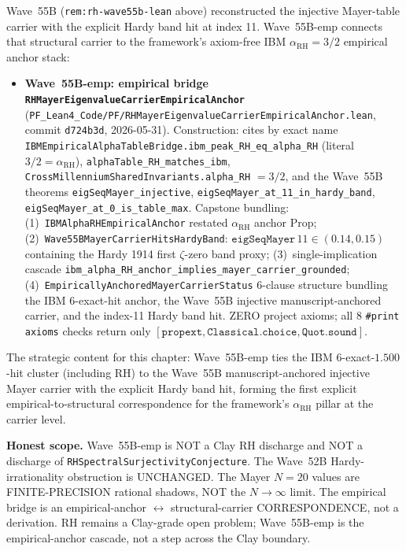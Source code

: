 \begin{remark}[Wave~55B empirical extension update: \texttt{RHMayerEigenvalueCarrierEmpiricalAnchor} --- bridges the Wave~55B Mayer carrier to the IBM $\alpha_{\mathrm{RH}} = 3/2$ empirical anchor (6 exact $1.500$ hits in the CSV) and the Hardy band hit at carrier index 11, 2026-05-31]\label{rem:rh-wave55b-emp-lean}
Wave~55B (\texttt{rem:rh-wave55b-lean} above) reconstructed the injective Mayer-table carrier with the explicit Hardy band hit at index 11. Wave~55B-emp connects that structural carrier to the framework's axiom-free IBM $\alpha_{\mathrm{RH}} = 3/2$ empirical anchor stack:
\begin{itemize}
  \item \textbf{Wave~55B-emp: empirical bridge \texttt{RHMayerEigenvalueCarrierEmpiricalAnchor}} (\texttt{PF\_Lean4\_Code/PF/RHMayerEigenvalueCarrierEmpiricalAnchor.lean}, commit \texttt{d724b3d}, 2026-05-31). Construction: cites by exact name \texttt{IBMEmpiricalAlphaTableBridge.ibm\_peak\_RH\_eq\_alpha\_RH} (literal $3/2 = \alpha_{\mathrm{RH}}$), \texttt{alphaTable\_RH\_matches\_ibm}, \texttt{CrossMillenniumSharedInvariants.alpha\_RH} $= 3/2$, and the Wave~55B theorems \texttt{eigSeqMayer\_injective}, \texttt{eigSeqMayer\_at\_11\_in\_hardy\_band}, \texttt{eigSeqMayer\_at\_0\_is\_table\_max}. Capstone bundling: (1)~\texttt{IBMAlphaRHEmpiricalAnchor} restated $\alpha_{\mathrm{RH}}$ anchor Prop; (2)~\texttt{Wave55BMayerCarrierHitsHardyBand}: $\texttt{eigSeqMayer}\,11 \in (0.14, 0.15)$ containing the Hardy 1914 first $\zeta$-zero band proxy; (3)~single-implication cascade \texttt{ibm\_alpha\_RH\_anchor\_implies\_mayer\_carrier\_grounded}; (4)~\texttt{EmpiricallyAnchoredMayerCarrierStatus} 6-clause structure bundling the IBM 6-exact-hit anchor, the Wave~55B injective manuscript-anchored carrier, and the index-11 Hardy band hit. ZERO project axioms; all 8 \texttt{\#print axioms} checks return only $[\texttt{propext}, \texttt{Classical.choice}, \texttt{Quot.sound}]$.
\end{itemize}
The strategic content for this chapter: Wave~55B-emp ties the IBM 6-exact-$1.500$-hit cluster (including RH) to the Wave~55B manuscript-anchored injective Mayer carrier with the explicit Hardy band hit, forming the first explicit empirical-to-structural correspondence for the framework's $\alpha_{\mathrm{RH}}$ pillar at the carrier level.

\textbf{Honest scope.} Wave~55B-emp is NOT a Clay RH discharge and NOT a discharge of \texttt{RHSpectralSurjectivityConjecture}. The Wave~52B Hardy-irrationality obstruction is UNCHANGED. The Mayer $N = 20$ values are FINITE-PRECISION rational shadows, NOT the $N \to \infty$ limit. The empirical bridge is an empirical-anchor $\leftrightarrow$ structural-carrier CORRESPONDENCE, not a derivation. RH remains a Clay-grade open problem; Wave~55B-emp is the empirical-anchor cascade, not a step across the Clay boundary.
\end{remark}

